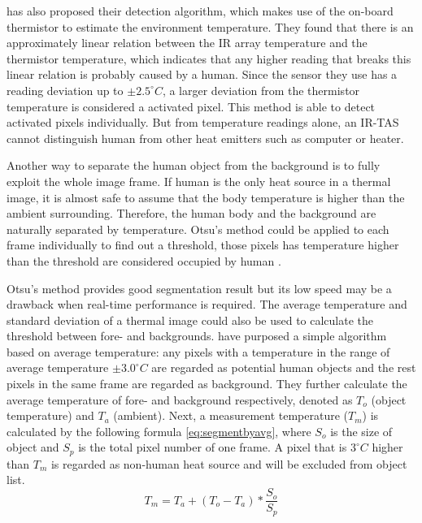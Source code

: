 \citeauthor{trofimova2017indoor} \cite{trofimova2017indoor} has also proposed their detection algorithm, which makes use of the on-board thermistor to estimate the environment temperature. They found that there is an approximately linear relation between the IR array temperature and the thermistor temperature, which indicates that any higher reading that breaks this linear relation is probably caused by a human. Since the sensor they use has a reading deviation up to $\pm 2.5^{\circ}C$, a larger deviation from the thermistor temperature is considered a activated pixel. This method is able to detect activated pixels individually. But from temperature readings alone, an IR-TAS cannot distinguish human from other heat emitters such as computer or heater.

Another way to separate the human object from the background is to fully exploit the whole image frame. If human is the only heat source in a thermal image, it is almost safe to assume that the body temperature is higher than the ambient surrounding. Therefore, the human body and the background are naturally separated by temperature. Otsu's method could be applied to each frame individually to find out a threshold, those pixels has temperature higher than the threshold are considered occupied by human \cite{firstflow}.

Otsu's method provides good segmentation result but its low speed may be a drawback when real-time performance is required. The average temperature and standard deviation of a thermal image could also be used to calculate the threshold between fore- and backgrounds. \citeauthor{virtualtrack} \cite{virtualtrack} have purposed a simple algorithm based on average temperature: any pixels with a temperature in the range of average temperature $\pm 3.0^\circ C$ are regarded as potential human objects and the rest pixels in the same frame are regarded as background. They further calculate the average temperature of fore- and background respectively, denoted as $T_o$ (object temperature) and $T_a$ (ambient). Next, a measurement temperature ($T_m$) is calculated by the following formula \autoref{eq:segmentbyavg}, where $S_o$ is the size of object and $S_p$ is the total pixel number of one frame. A pixel that is $3^\circ C$ higher than $T_m$ is regarded as non-human heat source and will be excluded from object list.
\begin{equation}\label{eq:segmentbyavg}
  T_m = T_a + (T_o-T_a)*\frac{S_o}{S_p}
\end{equation}

